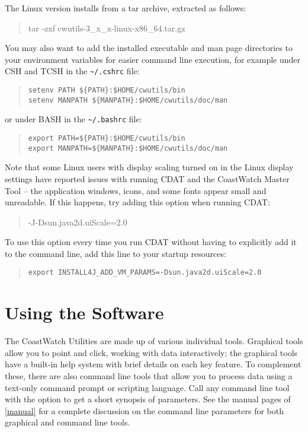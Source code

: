 The Linux version installs from a tar archive, extracted as follows:
\begin{quote}
  {\file tar -zxf cwutils-3\_x\_x-linux-x86\_64.tar.gz}
\end{quote}
You may also want to add the installed executable and man page directories to
your environment variables for easier command line
execution, for example under CSH and TCSH in the {\tt \~{ }/.cshrc} file:
\begin{quote}
  {\tt setenv PATH \$\{PATH\}:\$HOME/cwutils/bin} \\
  {\tt setenv MANPATH \$\{MANPATH\}:\$HOME/cwutils/doc/man}
\end{quote}
or under BASH in the {\tt \~{ }/.bashrc} file:
\begin{quote}
  {\tt export PATH=\$\{PATH\}:\$HOME/cwutils/bin} \\
  {\tt export MANPATH=\$\{MANPATH\}:\$HOME/cwutils/doc/man}
\end{quote}
Note that some Linux users with display scaling 
turned on in the Linux display settings have reported issues with 
running CDAT and the CoastWatch Master Tool -- the application windows, icons,
and some fonts appear small and unreadable.  If this happens, try adding this 
option when running CDAT:
\begin{quote}
  -J-Dsun.java2d.uiScale=2.0
\end{quote}
To use this option every time you run CDAT without having to explicitly add 
it to the command line, add this line to your startup resources:
\begin{quote}
  {\tt export INSTALL4J\_ADD\_VM\_PARAMS=-Dsun.java2d.uiScale=2.0}
\end{quote}

\section{Using the Software}

The CoastWatch Utilities are made up of various individual tools.
Graphical tools allow you to point and click, working with data
interactively; the graphical tools have a built-in help system
with brief details on each key feature.  To complement these,
there are also command line tools that allow you to process data
using a text-only command prompt or scripting language.  Call any
command line tool with the  option to get a
short synopsis of parameters.  See the manual pages of
\autoref{manual} for a complete discussion on the command line
parameters for both graphical and command line tools.

